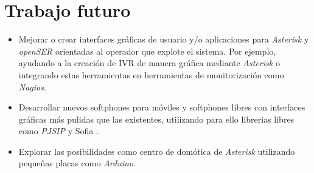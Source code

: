 \section*{Trabajo futuro}

\begin{itemize}
\item Mejorar o crear interfaces gráficas de usuario y/o aplicaciones para \emph{Asterisk} y \emph{openSER} orientadas al operador que explote el sistema. Por ejemplo, ayudando a la creación de IVR de manera gráfica mediante \emph{Asterisk} o integrando estas herramientas en herramientas de monitorización como \emph{Nagios}.
\item Desarrollar nuevos softphones para móviles y softphones libres con interfaces gráficas más pulidas que las existentes, utilizando para ello librerias libres como \emph{PJSIP} \cite{devel-pjsip} y Sofia \cite{devel-sofia}.
\item Explorar las posibilidades como centro de domótica de \emph{Asterisk} utilizando pequeñas placas como \emph{Arduino}.
\end{itemize}

